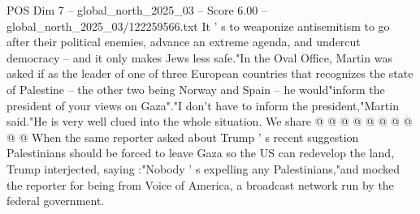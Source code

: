 \begin{textsample}{POS Dim 7 – global\_north\_2025\_03 – Score 6.00 – global\_north\_2025\_03/122259566.txt}
It ' s to weaponize antisemitism to go after their political enemies, advance an extreme agenda, and undercut democracy -- and it only makes Jews less safe."In the Oval Office, Martin was asked if as the leader of one of three European countries that recognizes the state of Palestine -- the other two being Norway and Spain -- he would"inform the president of your views on Gaza"."I don't have to inform the president,"Martin said."He is very well clued into the whole situation.
We share @ @ @ @ @ @ @ @ @ @ When the same reporter asked about Trump ' s recent suggestion Palestinians should be forced to leave Gaza so the US can redevelop the land, Trump interjected, saying :"Nobody ' s expelling any Palestinians,"and mocked the reporter for being from Voice of America, a broadcast network run by the federal government.

\end{textsample}
